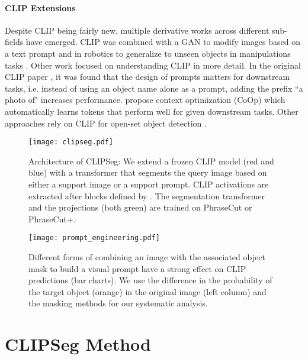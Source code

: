 \documentclass[10pt,twocolumn,letterpaper]{article}
\begin{document}
\paragraph{CLIP Extensions}
Despite CLIP \cite{radford20} being fairly new, multiple derivative works across different sub-fields have emerged.
CLIP was combined with a GAN to modify images based on a text prompt \cite{patashnik21styleclip} and
in robotics to generalize to unseen objects in manipulations tasks \cite{shridhar21cliport}.
Other work focused on understanding CLIP in more detail. In the original CLIP paper \cite{radford20}, it was found that the design of prompts matters for downstream tasks, i.e. instead of using an object name alone as a prompt, adding the prefix ``a photo of" increases performance. \citet{zhou21coop} propose context optimization (CoOp) which automatically learns tokens that perform well for given downstream tasks.
Other approaches rely on CLIP for open-set object detection \cite{gu21zero, esmaeilpour21zero}.








\begin{figure*}
\centering
 \texttt{[image: clipseg.pdf]}
\caption{Architecture of CLIPSeg: We extend a frozen CLIP model (red and blue) with a transformer that segments the query image based on either a support image or a support prompt.  CLIP activations are extracted after blocks defined by . The segmentation transformer and the projections (both green) are trained on PhraseCut or PhraseCut+.}\label{fig:clipseg}
\end{figure*}

\begin{figure}
\centering
\texttt{[image: prompt\_engineering.pdf]}
\caption{Different forms of combining an image with the associated object mask to build a visual prompt have a strong effect on CLIP predictions (bar charts). We use the difference in the probability of the target object (orange) in the original image (left column) and the masking methods for our systematic analysis.}
\label{fig:prompt_engineering}
\end{figure}






\section{CLIPSeg Method}
\end{document}
